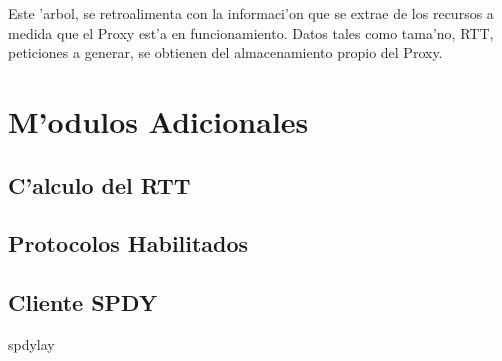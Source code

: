 Este 'arbol, se retroalimenta con la informaci'on que se extrae de los recursos a medida que el Proxy est'a en funcionamiento. Datos tales como tama'no, RTT, peticiones a generar, se obtienen del almacenamiento propio del Proxy. 

\section{M'odulos Adicionales}

\subsection{C'alculo del RTT}

\subsection{Protocolos Habilitados}

\subsection{Cliente SPDY}

spdylay